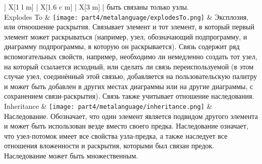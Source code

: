 \begin{center}
\begin{longtabu} {| X[1 l m] | X[1.6 c m] | X[3 m] |}
		                                                                                                                быть связаны только узлы. \\
		Explodes To                 & \texttt{[image: part4/metalanguage/explodesTo.png]}                  & Эксплозия, или отноошение раскрытия. Связывает элемент и тот элемент, в который 
		                                                                                                                первый элемент может раскрываться (например, узел, обозначающий подпрограмму, и диаграмму  
		                                                                                                                подпрограммы, в которую он раскрывается). Связь содержит ряд вспомогательных свойств, 
		                                                                                                                например, необходимо ли немедленно создать тот узел, на который ссылается исходный, или 
		                                                                                                                сделать ли связь переиспользуемой (в этом случае узел, соединённый этой связью, 
		                                                                                                                добавляется на пользовательскую палитру и может быть добавлен в других местах 
		                                                                                                                диаграммы или на другие диаграммы, с сохранением связи-раскрытия). Связь также  
		                                                                                                                учитывает отношение наследования. \\
		Inheritance                 & \texttt{[image: part4/metalanguage/inheritance.png]}                 & Наследование. Обозначает, что один элемент является подвидом другого элемента и может 
		                                                                                                                быть использован везде вместо своего предка. Наследование означает, что узел-потомок имеет  
		                                                                                                                все свойства узла-предка, а также наследует все отношения вложенности и раскрытия, 
		                                                                                                                которыми был связан предок. Наследование может быть множественным.
		\label{tab:metalanguage}
	\end{longtabu}
\end{center}